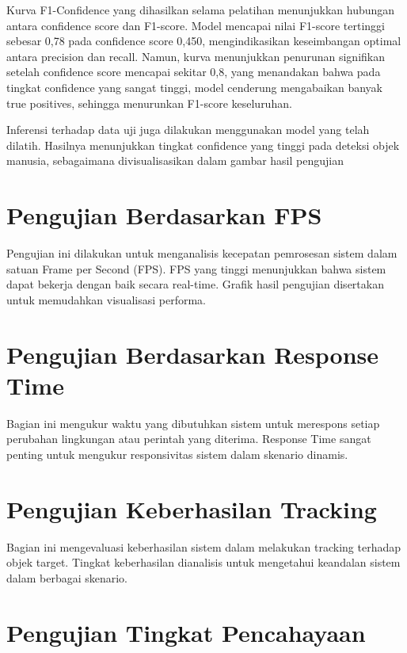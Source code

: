 Kurva F1-Confidence yang dihasilkan selama pelatihan menunjukkan hubungan antara confidence score dan F1-score. Model mencapai nilai F1-score tertinggi sebesar 0,78 pada confidence score 0,450, mengindikasikan keseimbangan optimal antara precision dan recall. Namun, kurva menunjukkan penurunan signifikan setelah confidence score mencapai sekitar 0,8, yang menandakan bahwa pada tingkat confidence yang sangat tinggi, model cenderung mengabaikan banyak true positives, sehingga menurunkan F1-score keseluruhan.

Inferensi terhadap data uji juga dilakukan menggunakan model yang telah dilatih. Hasilnya menunjukkan tingkat confidence yang tinggi pada deteksi objek manusia, sebagaimana divisualisasikan dalam gambar hasil pengujian

\section{Pengujian Berdasarkan FPS}
\label{sec:pengujianberdasarkanfps}

Pengujian ini dilakukan untuk menganalisis kecepatan pemrosesan sistem dalam satuan Frame per Second (FPS). FPS yang tinggi menunjukkan bahwa sistem dapat bekerja dengan baik secara real-time. Grafik hasil pengujian disertakan untuk memudahkan visualisasi performa.

\section{Pengujian Berdasarkan Response Time}
\label{sec:pengujianberdasarkanresponsetime}

Bagian ini mengukur waktu yang dibutuhkan sistem untuk merespons setiap perubahan lingkungan atau perintah yang diterima. Response Time sangat penting untuk mengukur responsivitas sistem dalam skenario dinamis.

\section{Pengujian Keberhasilan Tracking}
\label{sec:pengujiankeberhasiltracking}

Bagian ini mengevaluasi keberhasilan sistem dalam melakukan tracking terhadap objek target. Tingkat keberhasilan dianalisis untuk mengetahui keandalan sistem dalam berbagai skenario.

\section{Pengujian Tingkat Pencahayaan}
\label{sec:pengujiantingkatpencahayaan}

